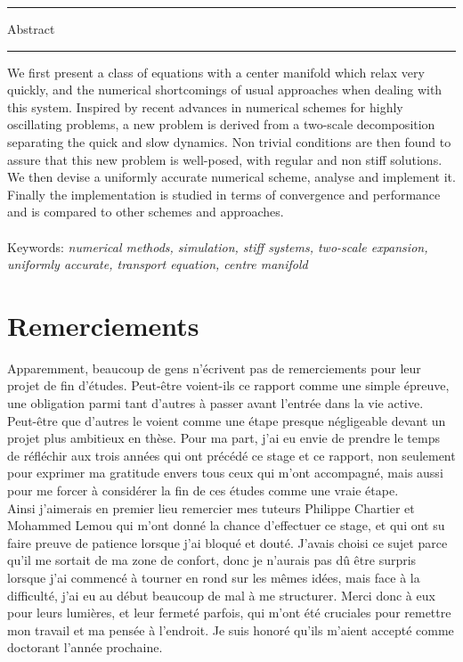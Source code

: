 \documentclass{templatePFE}
\begin{document}
\vspace{1.5cm}
\hrule\vspace{0.5pt}
{\scshape\bfseries\Huge \begin{center}Abstract\end{center}}
\vspace{0.5pt}\hrule\vspace{1.5cm}
We first present a class of equations with a center manifold which relax very quickly, and the numerical shortcomings of usual approaches when dealing with this system. 
Inspired by recent advances in numerical schemes for highly oscillating problems, a new problem is derived from a two-scale decomposition separating the quick and slow dynamics. 
Non trivial conditions are then found to assure that this new problem is well-posed, with regular and non stiff solutions.
We then devise a uniformly accurate numerical scheme, analyse and implement it.
Finally the implementation is studied in terms of convergence and performance and is compared to other schemes and approaches. 
\\
\\
Keywords$\!\!$: {\itshape 
numerical methods, simulation, stiff systems, two-scale expansion, uniformly accurate, transport equation, centre manifold
}

\chapter*{Remerciements}

Apparemment, beaucoup de gens n'écrivent pas de remerciements pour leur projet de fin d'études. 
Peut-être voient-ils ce rapport comme une simple épreuve, une obligation parmi tant d'autres à passer avant l'entrée dans la vie active. 
Peut-être que d'autres le voient comme une étape presque négligeable devant un projet plus ambitieux en thèse. 
Pour ma part, j'ai eu envie de prendre le temps de réfléchir aux trois années qui ont précédé ce stage et ce rapport, non seulement pour exprimer ma gratitude envers tous ceux qui m'ont accompagné, mais aussi pour me forcer à considérer la fin de ces études comme une vraie étape. 
\\ 

Ainsi j'aimerais en premier lieu remercier mes tuteurs Philippe Chartier et Mohammed Lemou qui m'ont donné la chance d'effectuer ce stage, et qui ont su faire preuve de patience lorsque j'ai bloqué et douté. 
J'avais choisi ce sujet parce qu'il me sortait de ma zone de confort, donc je n'aurais pas dû être surpris lorsque j'ai commencé à tourner en rond sur les mêmes idées, mais face à la difficulté, j'ai eu au début beaucoup de mal à me structurer. 
Merci donc à eux pour leurs lumières, et leur fermeté parfois, qui m'ont été cruciales pour remettre mon travail et ma pensée à l'endroit. 
Je suis honoré qu'ils m'aient accepté comme doctorant l'année prochaine. 
\end{document}
